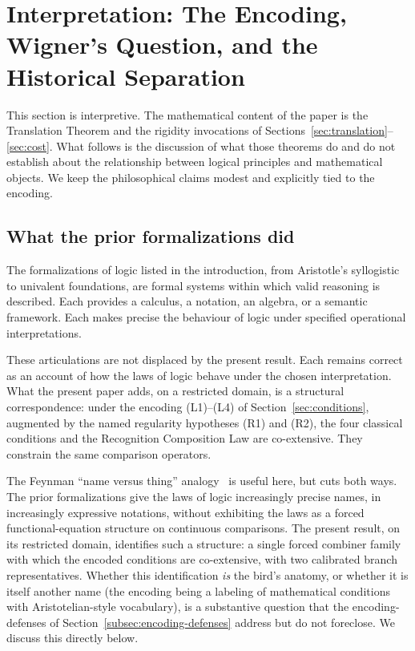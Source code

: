 \documentclass[11pt,a4paper]{article}
\theoremstyle{definition}
\theoremstyle{remark}
\begin{document}
\section{Interpretation: The Encoding, Wigner's Question, and the Historical Separation}\label{sec:wigner}

This section is interpretive. The mathematical content of the paper is
the Translation Theorem and the rigidity invocations of
Sections~\ref{sec:translation}--\ref{sec:cost}. What follows is the
discussion of what those theorems do and do not establish about the
relationship between logical principles and mathematical objects. We
keep the philosophical claims modest and explicitly tied to the
encoding.

\subsection{What the prior formalizations did}

The formalizations of logic listed in the introduction, from
Aristotle's syllogistic to univalent foundations, are formal systems
within which valid reasoning is described. Each provides a calculus, a
notation, an algebra, or a semantic framework. Each makes precise the
behaviour of logic under specified operational interpretations.

These articulations are not displaced by the present result. Each
remains correct as an account of how the laws of logic behave under the
chosen interpretation. What the present paper adds, on a restricted
domain, is a structural correspondence: under the encoding
(L1)--(L4) of Section~\ref{sec:conditions}, augmented by the named
regularity hypotheses (R1) and (R2), the four classical conditions and
the Recognition Composition Law are co-extensive. They constrain the
same comparison operators.

The Feynman ``name versus thing'' analogy~\cite{Feynman1964} is useful
here, but cuts both ways. The prior formalizations give the laws of
logic increasingly precise names, in increasingly expressive notations,
without exhibiting the laws as a forced functional-equation structure
on continuous comparisons. The present result, on its restricted
domain, identifies such a structure: a single forced combiner family
with which the encoded conditions are co-extensive, with two
calibrated branch representatives.
Whether this identification \emph{is} the bird's anatomy, or whether it
is itself another name (the encoding being a labeling of mathematical
conditions with Aristotelian-style vocabulary), is a substantive
question that the encoding-defenses of
Section~\ref{subsec:encoding-defenses} address but do not foreclose. We
discuss this directly below.
\end{document}
